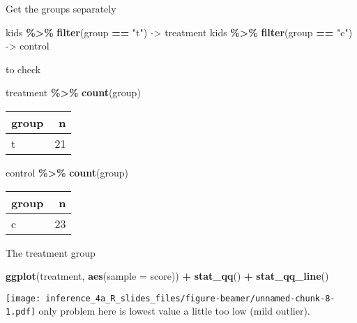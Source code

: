 \documentclass[
  ignorenonframetext,
]{beamer}
\newenvironment{Shaded}{\begin{snugshade}}{\end{snugshade}}
\newcommand{\DataTypeTok}[1]{\textcolor[rgb]{0.13,0.29,0.53}{#1}}
\newcommand{\KeywordTok}[1]{\textcolor[rgb]{0.13,0.29,0.53}{\textbf{#1}}}
\newcommand{\NormalTok}[1]{#1}
\newcommand{\OperatorTok}[1]{\textcolor[rgb]{0.81,0.36,0.00}{\textbf{#1}}}
\newcommand{\StringTok}[1]{\textcolor[rgb]{0.31,0.60,0.02}{#1}}
\begin{document}
\begin{frame}[fragile]{Get the groups separately}
\protect\hypertarget{get-the-groups-separately}{}
\begin{Shaded}
\begin{Highlighting}[]
\NormalTok{kids }\OperatorTok{\%\textgreater{}\%}\StringTok{ }\KeywordTok{filter}\NormalTok{(group }\OperatorTok{==}\StringTok{ "t"}\NormalTok{) {-}\textgreater{}}\StringTok{ }\NormalTok{treatment}
\NormalTok{kids }\OperatorTok{\%\textgreater{}\%}\StringTok{ }\KeywordTok{filter}\NormalTok{(group }\OperatorTok{==}\StringTok{ "c"}\NormalTok{) {-}\textgreater{}}\StringTok{ }\NormalTok{control}
\end{Highlighting}
\end{Shaded}

to check

\begin{Shaded}
\begin{Highlighting}[]
\NormalTok{treatment }\OperatorTok{\%\textgreater{}\%}\StringTok{ }\KeywordTok{count}\NormalTok{(group)}
\end{Highlighting}
\end{Shaded}

\begin{longtable}[]{@{}lr@{}}
\toprule
group & n\tabularnewline
\midrule
\endhead
t & 21\tabularnewline
\bottomrule
\end{longtable}

\begin{Shaded}
\begin{Highlighting}[]
\NormalTok{control }\OperatorTok{\%\textgreater{}\%}\StringTok{ }\KeywordTok{count}\NormalTok{(group)}
\end{Highlighting}
\end{Shaded}

\begin{longtable}[]{@{}lr@{}}
\toprule
group & n\tabularnewline
\midrule
\endhead
c & 23\tabularnewline
\bottomrule
\end{longtable}
\end{frame}

\begin{frame}[fragile]{The treatment group}
\protect\hypertarget{the-treatment-group}{}
\begin{Shaded}
\begin{Highlighting}[]
\KeywordTok{ggplot}\NormalTok{(treatment, }\KeywordTok{aes}\NormalTok{(}\DataTypeTok{sample =}\NormalTok{ score)) }\OperatorTok{+}\StringTok{ }
\StringTok{  }\KeywordTok{stat\_qq}\NormalTok{() }\OperatorTok{+}\StringTok{ }\KeywordTok{stat\_qq\_line}\NormalTok{()}
\end{Highlighting}
\end{Shaded}

\texttt{[image: inference\_4a\_R\_slides\_files/figure-beamer/unnamed-chunk-8-1.pdf]}
only problem here is lowest value a little too low (mild outlier).
\end{frame}
\end{document}
